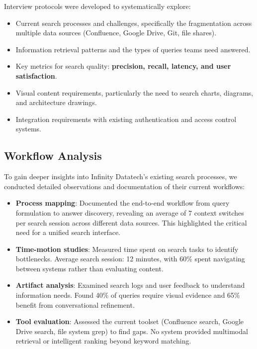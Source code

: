 \documentclass{report}
\begin{document}
Interview protocols were developed to systematically explore:

\begin{itemize}
    \item Current search processes and challenges, specifically the fragmentation across multiple data sources (Confluence, Google Drive, Git, file shares).
    \item Information retrieval patterns and the types of queries teams need answered.
    \item Key metrics for search quality: \textbf{precision, recall, latency, and user satisfaction}.
    \item Visual content requirements, particularly the need to search charts, diagrams, and architecture drawings.
    \item Integration requirements with existing authentication and access control systems.
\end{itemize}

\subsection{Workflow Analysis}
To gain deeper insights into Infinity Datatech's existing search processes, we conducted detailed observations and documentation of their current workflows:

\begin{itemize}
    \item \textbf{Process mapping}: Documented the end-to-end workflow from query formulation to answer discovery, revealing an average of 7 context switches per search session across different data sources. This highlighted the critical need for a unified search interface.
    \item \textbf{Time-motion studies}: Measured time spent on search tasks to identify bottlenecks. Average search session: 12 minutes, with 60\% spent navigating between systems rather than evaluating content.
    \item \textbf{Artifact analysis}: Examined search logs and user feedback to understand information needs. Found 40\% of queries require visual evidence and 65\% benefit from conversational refinement.
    \item \textbf{Tool evaluation}: Assessed the current toolset (Confluence search, Google Drive search, file system grep) to find gaps. No system provided multimodal retrieval or intelligent ranking beyond keyword matching.
\end{itemize}
\end{document}
